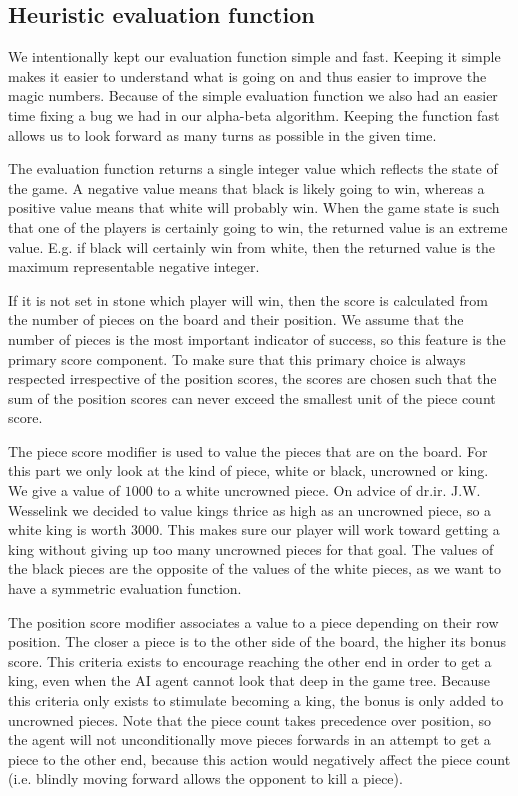 \documentclass[11pt,a4paper]{article}
\begin{document}
\subsection{Heuristic evaluation function}\label{section:heuri}
We intentionally kept our evaluation function simple and fast. Keeping it simple makes it easier to understand what is going on and thus easier to improve the magic numbers. Because of the simple evaluation function we also had an easier time fixing a bug we had in our alpha-beta algorithm. Keeping the function fast allows us to look forward as many turns as possible in the given time.

The evaluation function returns a single integer value which reflects the state of the game. A negative value means that black is likely going to win, whereas a positive value means that white will probably win. When the game state is such that one of the players is certainly going to win, the returned value is an extreme value. E.g. if black will certainly win from white, then the returned value is the maximum representable negative integer.

If it is not set in stone which player will win, then the score is calculated from the number of pieces on the board and their position.
We assume that the number of pieces is the most important indicator of success, so this feature is the primary score component. To make sure that this primary choice is always respected irrespective of the position scores, the scores are chosen such that the sum of the position scores can never exceed the smallest unit of the piece count score.

The piece score modifier is used to value the pieces that are on the board. For this part we only look at the kind of piece, white or black, uncrowned or king. We give a value of $1000$ to a white uncrowned piece. On advice of dr.ir. J.W. Wesselink we decided to value kings thrice as high as an uncrowned piece, so a white king is worth $3000$. This makes sure our player will work toward getting a king without giving up too many uncrowned pieces for that goal. The values of the black pieces are the opposite of the values of the white pieces, as we want to have a symmetric evaluation function.

The position score modifier associates a value to a piece depending on their row position. The closer a piece is to the other side of the board, the higher its bonus score. This criteria exists to encourage reaching the other end in order to get a king, even when the AI agent cannot look that deep in the game tree. Because this criteria only exists to stimulate becoming a king, the bonus is only added to uncrowned pieces. Note that the piece count takes precedence over position, so the agent will not unconditionally move pieces forwards in an attempt to get a piece to the other end, because this action would negatively affect the piece count (i.e. blindly moving forward allows the opponent to kill a piece).
\end{document}
